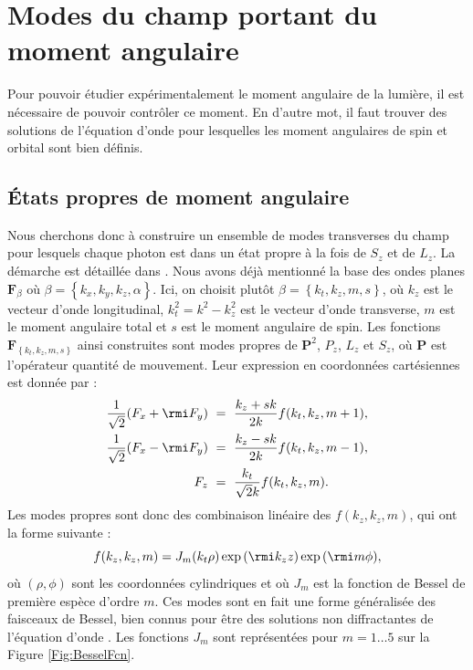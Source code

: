 \chapter{Modes du champ portant du moment angulaire}
Pour pouvoir étudier expérimentalement le moment angulaire de la lumière, il est nécessaire de pouvoir contrôler ce moment. En d'autre mot, il faut trouver des solutions de l'équation d'onde pour lesquelles les moment angulaires de spin et orbital sont bien définis.

\section{\'Etats propres de moment angulaire}
Nous cherchons donc à construire un ensemble de modes transverses du champ pour lesquels chaque photon est dans un état propre à la fois de $S_z$ et de $L_z$. La démarche est détaillée dans . Nous avons déjà mentionné la base des ondes planes $\bm{F}_\beta$ où $\beta=\left\{k_x,k_y,k_z,\alpha\right\}$. Ici, on choisit plutôt $\beta=\left\{k_t,k_z,m,s\right\}$, où $k_z$ est le vecteur d'onde longitudinal, $k_t^2=k^2-k_z^2$ est le vecteur d'onde transverse, $m$ est le moment angulaire total et $s$ est le moment angulaire de spin. Les fonctions $\bm{F}_{\left\{k_t,k_z,m,s\right\}}$ ainsi construites sont modes propres de $\bm{P}^2$, $P_z$, $L_z$ et $S_z$, où $\bm{P}$ est l'opérateur quantité de mouvement. Leur expression en coordonnées cartésiennes est donnée par :
\begin{equation}
\begin{aligned}
\frac{1}{\sqrt{2}}(F_x+\rmi F_y) ~&= ~\frac{k_z + sk}{2k}f(k_t,k_z,m+1),\\
\frac{1}{\sqrt{2}}(F_x-\rmi F_y) ~&= ~\frac{k_z - sk}{2k}f(k_t,k_z,m-1),\\
F_z ~&= ~\frac{k_t}{\sqrt{2}k}f(k_t,k_z,m).
\end{aligned}
\label{eqAMModes}
\end{equation}
Les modes propres sont donc des combinaison linéaire des $f(k_z,k_z,m)$, qui ont la forme suivante :
\begin{equation}
f(k_z,k_z,m) = J_m(k_t\rho)\exp{(\rmi k_zz)}\exp{(\rmi m\phi)},
\label{eqModeFcn}
\end{equation}
où $(\rho,\phi)$ sont les coordonnées cylindriques et où $J_m$ est la fonction de Bessel de première espèce d'ordre $m$. Ces modes sont en fait une forme généralisée des faisceaux de Bessel, bien connus pour être des solutions non diffractantes de l'équation d'onde . Les fonctions $J_m$ sont représentées pour $m=1\ldots5$ sur la Figure \ref{Fig:BesselFcn}. 

